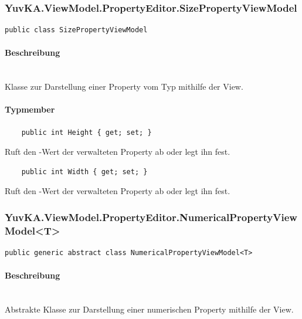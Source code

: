 \subsubsection{YuvKA.ViewModel.PropertyEditor.SizePropertyViewModel}

\begin{verbatim}
public class SizePropertyViewModel
\end{verbatim}

\paragraph{Beschreibung}~\\
Klasse zur Darstellung einer Property vom Typ  mithilfe der View.

\paragraph{Typmember}
\begin{itemize}
	
	\begin{verbatim}
	public int Height { get; set; }
	\end{verbatim}
	Ruft den -Wert der verwalteten  Property ab oder legt ihn fest.

	\begin{verbatim}
	public int Width { get; set; }
	\end{verbatim}
	Ruft den -Wert der verwalteten  Property ab oder legt ihn fest.

\end{itemize}




\subsubsection{YuvKA.ViewModel.PropertyEditor.NumericalPropertyViewModel<T>}

\begin{verbatim}
public generic abstract class NumericalPropertyViewModel<T>
\end{verbatim}

\paragraph{Beschreibung}~\\
Abstrakte Klasse zur Darstellung einer numerischen Property mithilfe der View.

